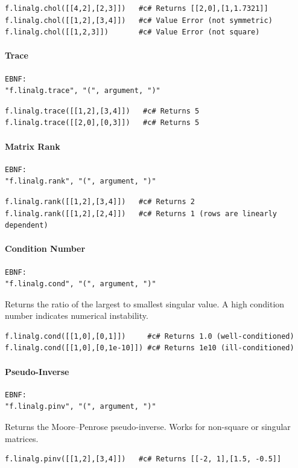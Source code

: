 \begin{verbatim}
f.linalg.chol([[4,2],[2,3]])   #c# Returns [[2,0],[1,1.7321]]
f.linalg.chol([[1,2],[3,4]])   #c# Value Error (not symmetric)
f.linalg.chol([[1,2,3]])       #c# Value Error (not square)
\end{verbatim}

\paragraph{Trace}
\begin{verbatim}
EBNF:
"f.linalg.trace", "(", argument, ")"
\end{verbatim}
\begin{verbatim}
f.linalg.trace([[1,2],[3,4]])   #c# Returns 5
f.linalg.trace([[2,0],[0,3]])   #c# Returns 5
\end{verbatim}

\paragraph{Matrix Rank}
\begin{verbatim}
EBNF:
"f.linalg.rank", "(", argument, ")"
\end{verbatim}
\begin{verbatim}
f.linalg.rank([[1,2],[3,4]])   #c# Returns 2
f.linalg.rank([[1,2],[2,4]])   #c# Returns 1 (rows are linearly dependent)
\end{verbatim}

\paragraph{Condition Number}
\begin{verbatim}
EBNF:
"f.linalg.cond", "(", argument, ")"
\end{verbatim}
Returns the ratio of the largest to smallest singular value. A high condition number indicates numerical instability.
\begin{verbatim}
f.linalg.cond([[1,0],[0,1]])     #c# Returns 1.0 (well-conditioned)
f.linalg.cond([[1,0],[0,1e-10]]) #c# Returns 1e10 (ill-conditioned)
\end{verbatim}

\paragraph{Pseudo-Inverse}
\begin{verbatim}
EBNF:
"f.linalg.pinv", "(", argument, ")"
\end{verbatim}
Returns the Moore--Penrose pseudo-inverse. Works for non-square or singular matrices.
\begin{verbatim}
f.linalg.pinv([[1,2],[3,4]])   #c# Returns [[-2, 1],[1.5, -0.5]]
\end{verbatim}

